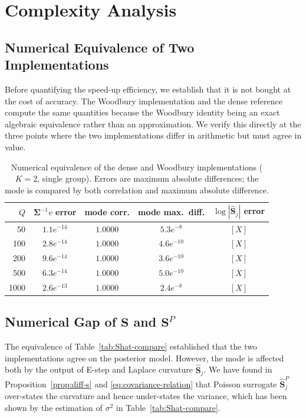 \section{Complexity Analysis}
\label{sec:complexity-analysis}

\subsection{Numerical Equivalence of Two Implementations}
\label{sec:equivalence}

Before quantifying the speed-up efficiency, we establish that it is not bought at the cost of accuracy.
The Woodbury implementation and the dense reference compute the same quantities because the
Woodbury identity being an exact algebraic equivalence rather than an approximation. We verify
this directly at the three points where the two implementations differ in arithmetic but must
agree in value.

\begin{table}[H]
\centering
\caption{Numerical equivalence of the dense and Woodbury implementations
($K=2$, single group). Errors are maximum absolute differences; the mode is
compared by both correlation and maximum absolute difference.}
\label{tab:equivalence}
\begin{tabular}{@{}rcccc@{}}
\toprule
$Q$ & $\bm\Sigma^{-1}v$ error & mode corr. & mode max.\ diff. & $\log|\widehat{\mathbf S}_j|$ error \\
\midrule
50   & $1.1e^{-14}$ & $1.0000$ & $5.3e^{-8}$ & $[X]$ \\
100  & $2.8e^{-14}$ & $1.0000$ & $4.6e^{-10}$ & $[X]$ \\
200  & $9.6e^{-14}$ & $1.0000$ & $3.6e^{-10}$ & $[X]$ \\
500  & $6.3e^{-14}$ & $1.0000$ & $5.0e^{-10}$ & $[X]$ \\
1000 & $2.6e^{-13}$ & $1.0000$ & $2.4e^{-8}$ & $[X]$ \\
\bottomrule
\end{tabular}
\end{table}

\subsection{Numerical Gap of $\mathbf{S}$  and $\mathbf{S}^{P}$}
\label{sec:equivalence}

The equivalence of Table~\ref{tab:Shat-compare} established that the two implementations agree on the posterior model. However, the mode is affected both by the output of E-step and Laplace curvature $\hat{\mathbf{S}}_{j}$. We have found in Proposition~\ref{prop:diff-s} and \eqref{eq:covariance-relation} that Poisson surrogate $\hat{\mathbf{S}}^{P}_{j}$ over-states the curvature and hence under-states the variance, which has been shown by the estimation of $\sigma^{2}$ in Table~\ref{tab:Shat-compare}. 

